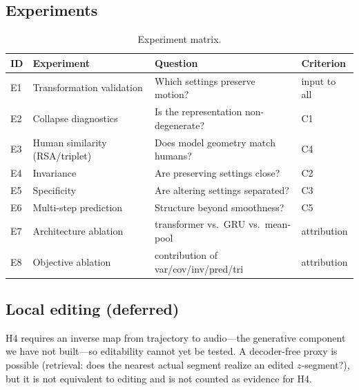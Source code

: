 \documentclass[11pt]{article}
\begin{document}
\subsection{Experiments}
\begin{table}[t]
\centering
\small
\begin{tabular}{@{}llll@{}}
\toprule
ID & Experiment & Question & Criterion \\
\midrule
E1 & Transformation validation & Which settings preserve motion? & input to all \\
E2 & Collapse diagnostics & Is the representation non-degenerate? & C1 \\
E3 & Human similarity (RSA/triplet) & Does model geometry match humans? & C4 \\
E4 & Invariance & Are preserving settings close? & C2 \\
E5 & Specificity & Are altering settings separated? & C3 \\
E6 & Multi-step prediction & Structure beyond smoothness? & C5 \\
E7 & Architecture ablation & transformer vs.\ GRU vs.\ mean-pool & attribution \\
E8 & Objective ablation & contribution of var/cov/inv/pred/tri & attribution \\
\bottomrule
\end{tabular}
\caption{Experiment matrix.}
\label{tab:experiments}
\end{table}

\subsection{Local editing (deferred)}
H4 requires an inverse map from trajectory to audio---the generative component we
have not built---so editability cannot yet be tested. A decoder-free proxy is
possible (retrieval: does the nearest actual segment realize an edited
$z$-segment?), but it is not equivalent to editing and is not counted as evidence
for H4.
\end{document}
